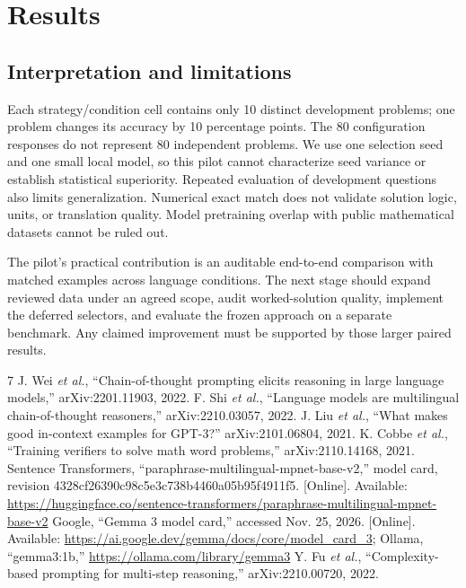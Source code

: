\documentclass[conference]{IEEEtran}
\begin{document}
\section{Results}


\subsection{Interpretation and limitations}
Each strategy/condition cell contains only 10 distinct development problems; one problem changes its accuracy by 10 percentage points. The 80 configuration responses do not represent 80 independent problems. We use one selection seed and one small local model, so this pilot cannot characterize seed variance or establish statistical superiority. Repeated evaluation of development questions also limits generalization. Numerical exact match does not validate solution logic, units, or translation quality. Model pretraining overlap with public mathematical datasets cannot be ruled out.

The pilot's practical contribution is an auditable end-to-end comparison with matched examples across language conditions. The next stage should expand reviewed data under an agreed scope, audit worked-solution quality, implement the deferred selectors, and evaluate the frozen approach on a separate benchmark. Any claimed improvement must be supported by those larger paired results.

\begin{thebibliography}{7}
 J. Wei \emph{et al.}, ``Chain-of-thought prompting elicits reasoning in large language models,'' arXiv:2201.11903, 2022.
 F. Shi \emph{et al.}, ``Language models are multilingual chain-of-thought reasoners,'' arXiv:2210.03057, 2022.
 J. Liu \emph{et al.}, ``What makes good in-context examples for GPT-3?'' arXiv:2101.06804, 2021.
 K. Cobbe \emph{et al.}, ``Training verifiers to solve math word problems,'' arXiv:2110.14168, 2021.
 Sentence Transformers, ``paraphrase-multilingual-mpnet-base-v2,'' model card, revision 4328cf26390c98c5e3c738b4460a05b95f4911f5. [Online]. Available: \url{https://huggingface.co/sentence-transformers/paraphrase-multilingual-mpnet-base-v2}
 Google, ``Gemma 3 model card,'' accessed Nov. 25, 2026. [Online]. Available: \url{https://ai.google.dev/gemma/docs/core/model_card_3}; Ollama, ``gemma3:1b,'' \url{https://ollama.com/library/gemma3}
 Y. Fu \emph{et al.}, ``Complexity-based prompting for multi-step reasoning,'' arXiv:2210.00720, 2022.
\end{thebibliography}
\end{document}
